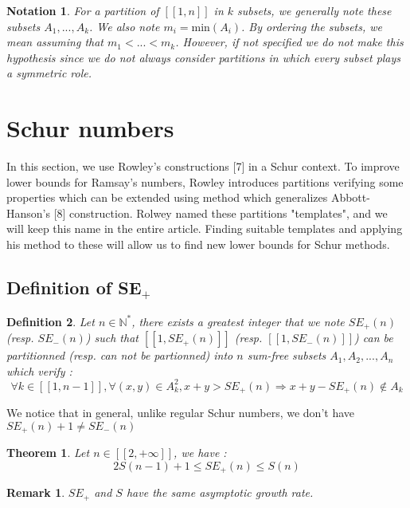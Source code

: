 \documentclass{article}
\newtheorem{definition}{Definition}[section]
\newtheorem{notation}[definition]{Notation}
\newtheorem{theorem}{Theorem}[section]
\newtheorem{computational theorem}{Computational Theorem}[theorem]
\newtheorem{remark}{Remark}[section]
\begin{document}
\begin{notation}
For a partition of \([\![1, n]\!]\) in \(k\) subsets, we generally note these subsets \(A_1, ..., A_k\). We also note \(m_i = \text{min}(A_i)\). 
By ordering the subsets, we mean assuming that \(m_1 < ... < m_k\). However, if not specified we do not make this hypothesis since we 
do not always consider partitions in which every subset plays a symmetric role.
\end{notation}



\section{Schur numbers}

\qquad In this section, we use Rowley's constructions [7] in a Schur context. To improve lower bounds for Ramsay's numbers, Rowley 
introduces partitions verifying some properties which can be extended using method which generalizes Abbott-Hanson's [8] construction. 
Rolwey named these partitions "templates", and we will keep this name in the entire article. Finding suitable templates and applying his 
method to these will allow us to find new lower bounds for Schur methods.

\subsection{Definition of SE\(_+\)}

\begin{definition}
Let \( n \in \mathbb{N}^*\), there exists a greatest integer that we note \(SE_+(n)\) (resp. \(SE_-(n)\)) such that \( [\![1, SE_+(n)]\!]\) 
(resp. \( [\![1, SE_-(n)]\!]\)) can be partitionned (resp. can not be partionned) into \(n\) sum-free subsets \(A_1, A_2, ..., A_n\) which verify :
\[
\forall k \in [\![1, n-1]\!], \forall (x,y) \in A_k^2, x+y > SE_+(n)
\Longrightarrow x+y-SE_+(n) \notin A_k
\]
\end{definition}
We notice that in general, unlike regular Schur numbers, we don't have \(SE_+(n) + 1 \neq SE_-(n)\)

\begin{theorem}
Let \(n \in [\![2, +\infty]\!]\), we have :
\[
2S(n-1)+1 \leqslant SE_+(n) \leqslant S(n)
\]
\end{theorem}

\begin{remark}
\(SE_+\) and \(S\) have the same asymptotic growth rate.
\end{remark}
\end{document}
